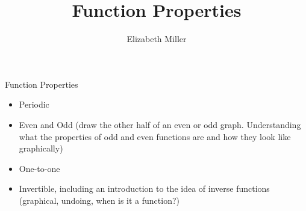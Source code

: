 \documentclass{ximera}
\author{Elizabeth Miller}
\title{Function Properties}
\begin{document}
\begin{abstract}
\end{abstract}
\maketitle


\begin{objectives}

\item Function Properties
\begin{itemize}
	\item Periodic
	\item Even and Odd (draw the other half of an even or odd graph. Understanding what the properties of odd and even functions are and how they look like graphically) 
	\item One-to-one 
	\item Invertible, including an introduction to the idea of inverse functions (graphical, undoing, when is it a function?) 
\end{itemize}




\end{objectives}
\end{document}
